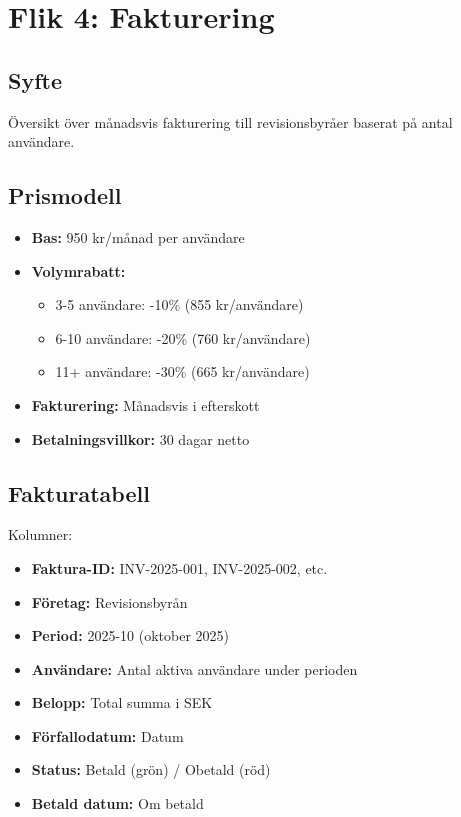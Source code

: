 \documentclass[12pt,a4paper]{article}
\begin{document}
\section{Flik 4: Fakturering}

\subsection{Syfte}
Översikt över månadsvis fakturering till revisionsbyråer baserat på antal användare.

\subsection{Prismodell}
\begin{itemize}
  \item \textbf{Bas:} 950 kr/månad per användare
  \item \textbf{Volymrabatt:}
  \begin{itemize}
    \item 3-5 användare: -10\% (855 kr/användare)
    \item 6-10 användare: -20\% (760 kr/användare)
    \item 11+ användare: -30\% (665 kr/användare)
  \end{itemize}
  \item \textbf{Fakturering:} Månadsvis i efterskott
  \item \textbf{Betalningsvillkor:} 30 dagar netto
\end{itemize}

\subsection{Fakturatabell}
Kolumner:
\begin{itemize}
  \item \textbf{Faktura-ID:} INV-2025-001, INV-2025-002, etc.
  \item \textbf{Företag:} Revisionsbyrån
  \item \textbf{Period:} 2025-10 (oktober 2025)
  \item \textbf{Användare:} Antal aktiva användare under perioden
  \item \textbf{Belopp:} Total summa i SEK
  \item \textbf{Förfallodatum:} Datum
  \item \textbf{Status:} Betald (grön) / Obetald (röd)
  \item \textbf{Betald datum:} Om betald
\end{itemize}
\end{document}
